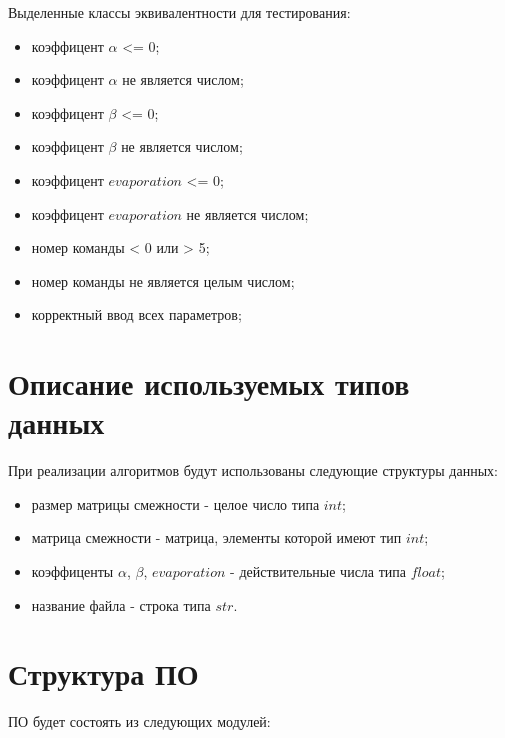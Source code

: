 \documentclass[a4paper,14pt, unknownkeysallowed]{extreport}
\begin{document}
Выделенные классы эквивалентности для тестирования:

\begin{itemize}
	\item коэффицент $\alpha$ <= 0;
	\item коэффицент $\alpha$ не является числом;
	\item коэффицент $\beta$ <= 0;
	\item коэффицент $\beta$ не является числом;
	\item коэффицент $evaporation$ <= 0;
	\item коэффицент $evaporation$ не является числом;
	\item номер команды < 0 или > 5;
	\item номер команды не является целым числом;
	\item корректный ввод всех параметров;
\end{itemize}

\section{Описание используемых типов данных}

При реализации алгоритмов будут использованы следующие структуры данных:

\begin{itemize}
	\item размер матрицы смежности - целое число типа $int$;
	\item матрица смежности - матрица, элементы которой имеют тип $int$;
	\item коэффиценты $\alpha$, $\beta$, $evaporation$ - действительные числа типа $float$;
	\item название файла - строка типа $str$.
\end{itemize}

\clearpage

\section{Структура ПО}

ПО будет состоять из следующих модулей:
\end{document}
